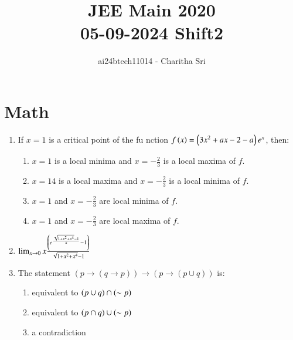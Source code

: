 \documentclass[journal,12pt,onecolumn]{IEEEtran}
\theoremstyle{remark}
\begin{document}

\vspace{3cm}

\title{JEE Main 2020 \\ 05-09-2024 Shift2}
\author{ai24btech11014 - Charitha Sri}

\maketitle
\bigskip       
\renewcommand{\thefigure}{\theenumi}
\renewcommand{\thetable}{\theenumi}



\section{Math}                                                       \begin{enumerate}                     
\item If $x=1$ is a critical point of the fu    nction $f\left(x\right) = \left(3x^{2}+ax-2-a\right)e^{x}$, then:        
\begin{enumerate}                            
\item $x=1$ is a local minima and $ x = -\frac{2}{3}$ is a local maxima of $f$.          
\item $x=14$ is a local maxima and $x=-\frac{2}{3}$ is a local minima of $f$.            
\item $x=1$ and $x=-\frac{2}{3}$ are local minima of $f$.             \item $x=1$ and $x=-\frac{2}{3}$ are local maxima of $f$.          \end{enumerate}
  \item $\lim_{x \to 0} x \frac{\left( e^{\frac{\sqrt{1+x^{2}+x^{4}} - 1}{x}} -1 \right)}{\sqrt{1+x^{2}+x^{4}} - 1}$\begin{enumerate}
  \end{enumerate}
 \item The statement $
(p \rightarrow (q \rightarrow p)) \rightarrow (p \rightarrow (p \cup q))$
 is:
  \begin{enumerate}
 \item equivalent to $\left(p \cup q\right) \cap \left( \sim p\right)$        \item equivalent to $\left(p \cap q\right) \cup \left( \sim p\right)$           \item a contradiction

\end{enumerate}
\end{enumerate}
\end{document}
